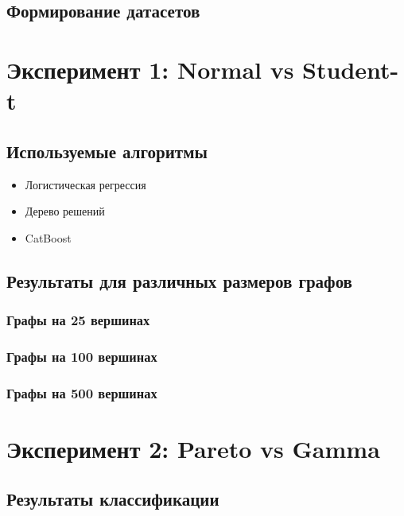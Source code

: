 \documentclass[a4paper,12pt]{report}
\begin{document}
\subsection{Формирование датасетов}

\section{Эксперимент 1: Normal vs Student-t}

\subsection{Используемые алгоритмы}
\begin{itemize}
    \item Логистическая регрессия
    \item Дерево решений
    \item CatBoost
\end{itemize}

\subsection{Результаты для различных размеров графов}

\subsubsection{Графы на 25 вершинах}

\subsubsection{Графы на 100 вершинах}

\subsubsection{Графы на 500 вершинах}

\section{Эксперимент 2: Pareto vs Gamma}

\subsection{Результаты классификации}
\end{document}

